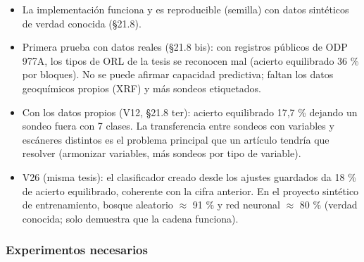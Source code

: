 \documentclass[
  10pt,
]{article}
\providecommand{\tightlist}{%
  \setlength{\itemsep}{0pt}\setlength{\parskip}{0pt}}
\begin{document}
\begin{itemize}
\tightlist
\item
  La implementación funciona y es reproducible (semilla) con datos
  sintéticos de verdad conocida (§21.8).
\item
  Primera prueba con datos reales (§21.8 bis): con registros públicos de
  ODP 977A, los tipos de ORL de la tesis se reconocen mal (acierto
  equilibrado 36 \% por bloques). No se puede afirmar capacidad
  predictiva; faltan los datos geoquímicos propios (XRF) y más sondeos
  etiquetados.
\item
  Con los datos propios (V12, §21.8 ter): acierto equilibrado 17,7 \%
  dejando un sondeo fuera con 7 clases. La transferencia entre sondeos
  con variables y escáneres distintos es el problema principal que un
  artículo tendría que resolver (armonizar variables, más sondeos por
  tipo de variable).
\item
  V26 (misma tesis): el clasificador creado desde los ajustes guardados
  da 18 \% de acierto equilibrado, coherente con la cifra anterior. En
  el proyecto sintético de entrenamiento, bosque aleatorio $\approx$ 91 \% y red
  neuronal $\approx$ 80 \% (verdad conocida; solo demuestra que la cadena
  funciona).
\end{itemize}

\hypertarget{experimentos-necesarios-2}{%
\subsubsection{Experimentos
necesarios}\label{experimentos-necesarios-2}}
\end{document}
